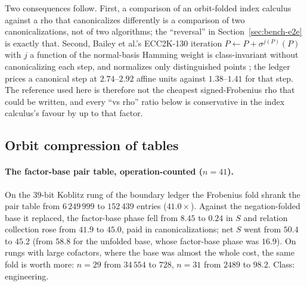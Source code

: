 Two consequences follow. First, a comparison of an orbit-folded
index calculus against a rho that canonicalizes differently is a
comparison of two canonicalizations, not of two algorithms; the
``reversal'' in Section~\ref{sec:bench-e2e} is exactly that. Second,
Bailey et al.'s ECC2K-130 iteration $P\leftarrow P+\sigma^{j(P)}(P)$
with $j$ a function of the normal-basis Hamming weight is
class-invariant without canonicalizing each step, and normalizes only
distinguished points \citep{bailey2009}; the ledger prices a
canonical step at $2.74$--$2.92$ affine units against
$1.38$--$1.41$ for that step. The reference used here is therefore not the cheapest signed-Frobenius
rho that could be written, and every ``vs rho'' ratio below is
conservative in the index calculus's favour by up to that factor.

\subsection{Orbit compression of tables}
\label{sec:bench-tables}

\paragraph{The factor-base pair table, operation-counted ($n=41$).}
On the $39$-bit Koblitz rung of the boundary ledger the Frobenius fold
shrank the pair table from $6\,249\,999$ to $152\,439$ entries
($41.0\times$). Against the negation-folded base it replaced, the
factor-base phase fell from $8.45$ to $0.24$ in $S$ and relation
collection rose from $41.9$ to $45.0$, paid in canonicalizations;
net $S$ went from $50.4$ to $45.2$ (from $58.8$ for the unfolded
base, whose factor-base phase was $16.9$). On rungs with large cofactors, where the base was
almost the whole cost, the same fold is worth more: $n=29$ from
$34\,554$ to $728$, $n=31$ from $2489$ to $98.2$. Class:
engineering.

